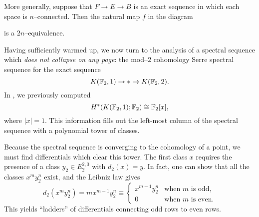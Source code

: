 \begin{remark}\label{ConnectedExactAndCoexactAgree}
More generally, suppose that $F \to E \to B$ is an exact sequence in which each space is $n$--connected.  Then the natural map $f$ in the diagram
\begin{center}
\end{center}
is a $2n$--equivalence.
\end{remark}

\begin{example}\label{Mod2CohomOfMod2EMSpaces}%
Having sufficiently warmed up, we now turn to the analysis of a spectral sequence which \emph{does not collapse on any page}: the mod--$2$ cohomology Serre spectral sequence for the exact sequence \[K(\mathbb F_2, 1) \to * \to K(\mathbb F_2, 2).\]
In , we previously computed \[H^*(K(\mathbb F_2, 1); \mathbb F_2) \cong \mathbb F_2[x],\] where $|x| = 1$.
This information fills out the left-most column of the spectral sequence with a polynomial tower of classes.

Because the spectral sequence is converging to the cohomology of a point, we must find differentials which clear this tower.
The first class $x$ requires the presence of a class $y_2 \in E_2^{2, 0}$ with $d_2(x) = y$.
In fact, one can show that all the classes $x^m y_2^n$ exist, and the Leibniz law gives \[d_2(x^m y_2^n) = m x^{m-1} y_2^n \equiv \begin{cases} x^{m-1} y_2^n & \text{when $m$ is odd}, \\ 0 & \text{when $m$ is even}. \end{cases}\]
This yields ``ladders'' of differentials connecting odd rows to even rows.


\end{example}
